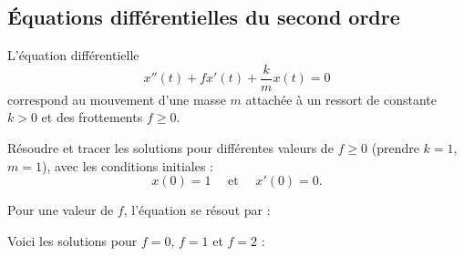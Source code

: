 \documentclass[class=report,crop=false]{standalone}
\begin{document}
\subsection{\'Equations différentielles du second ordre}

\begin{tp}
L'équation différentielle
$$x''(t) +f x'(t)+ \frac{k}{m} x(t) = 0$$ 
correspond au mouvement d'une masse $m$ 
attachée à un ressort de constante $k>0$
et des frottements $f\ge0$.


Résoudre et tracer les solutions pour 
différentes valeurs de $f\ge0$ (prendre $k=1$, $m=1$), 
avec les conditions initiales :
$$x(0)= 1 \quad \text{ et } \quad x'(0)=0.$$
\end{tp}

Pour une valeur de $f$, l'équation se résout par : \\
\centerline{}

Voici les solutions pour $f=0$, $f=1$ et $f=2$ :
\end{document}
